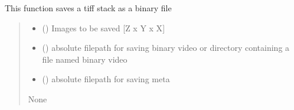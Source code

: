 \documentclass[letterpaper,10pt,english]{sphinxmanual}
\begin{document}

\begin{fulllineitems}
\label{\detokenize{CalSciPy.io:CalSciPy.io.save_raw_binary}}
\pysigstartsignatures
{}
\pysigstopsignatures
\sphinxAtStartPar
This function saves a tiff stack as a binary file
\begin{quote}\begin{description}
\begin{itemize}
\item {} 
\sphinxAtStartPar
{} () \sphinxhyphen{}\sphinxhyphen{} Images to be saved {[}Z x Y x X{]}

\item {} 
\sphinxAtStartPar
{} () \sphinxhyphen{}\sphinxhyphen{} absolute filepath for saving binary video or directory containing a file named binary video

\item {} 
\sphinxAtStartPar
{} () \sphinxhyphen{}\sphinxhyphen{} absolute filepath for saving meta

\end{itemize}

\sphinxAtStartPar
None

\end{description}\end{quote}

\end{fulllineitems}

\end{document}
